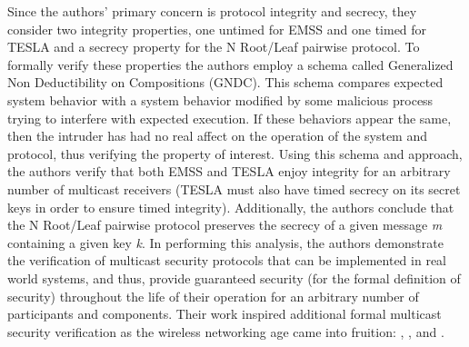 \documentclass[11pt, journal]{IEEEtran}
\begin{document}
Since the authors' primary concern is protocol integrity and secrecy, they consider two integrity properties, one untimed for EMSS and one timed for \textmugreek TESLA and a secrecy property for the N Root/Leaf pairwise protocol. To formally verify these properties the authors employ a schema called Generalized Non Deductibility on Compositions (GNDC). This schema compares expected system behavior with a system behavior modified by some malicious process trying to interfere with expected execution. If these behaviors appear the same, then the intruder has had no real affect on the operation of the system and protocol, thus verifying the property of interest. Using this schema and approach, the authors verify that both EMSS and \textmugreek TESLA enjoy integrity for an arbitrary number of multicast receivers (\textmugreek TESLA must also have timed secrecy on its secret keys in order to ensure timed integrity). Additionally, the authors conclude that the N Root/Leaf pairwise protocol preserves the secrecy of a given message \textit{m} containing a given key \textit{k}.
\bigbreak
In performing this analysis, the authors demonstrate the verification of multicast security protocols that can be implemented in real world systems, and thus, provide guaranteed security (for the formal definition of security) throughout the life of their operation for an arbitrary number of participants and components. Their work inspired additional formal multicast security verification as the wireless networking age came into fruition: \cite{Martina2015}, \cite{Bella2002}, and \cite{Archer2002}. 
\bigbreak
\end{document}
